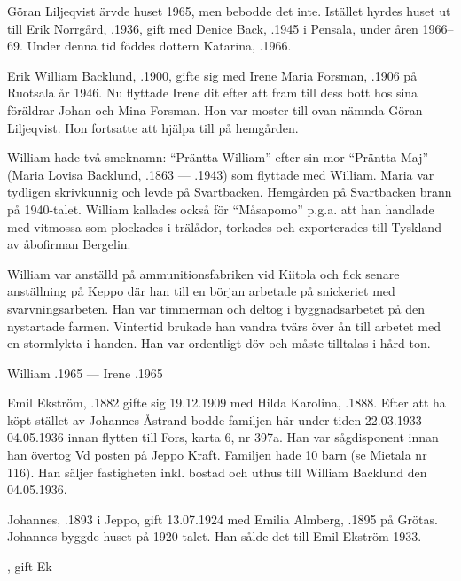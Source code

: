 %
Göran Liljeqvist ärvde huset 1965, men bebodde det inte. Istället hyrdes huset ut till Erik Norrgård, .1936, gift med Denice Back, .1945 i Pensala, under åren 1966--69. Under denna tid föddes dottern Katarina, .1966.


%
Erik William Backlund, .1900, gifte sig med Irene Maria Forsman, .1906 på Ruotsala år 1946. Nu flyttade Irene dit efter att fram till dess bott hos sina föräldrar Johan och Mina Forsman. Hon var moster till ovan nämnda Göran Liljeqvist. Hon fortsatte att hjälpa till på hemgården.

William hade två smeknamn: ``Präntta-William'' efter sin mor ``Präntta-Maj'' (Maria Lovisa Backlund, .1863 --- .1943) som flyttade med William. Maria var tydligen skrivkunnig och levde på Svartbacken. Hemgården på Svartbacken brann på 1940-talet. William kallades också för ``Måsapomo'' p.g.a. att han handlade med vitmossa som plockades i trälådor, torkades och exporterades till Tyskland av åbofirman Bergelin.

William var anställd på ammunitionsfabriken vid Kiitola och fick senare anställning på Keppo där han till en början arbetade på snickeriet med svarvningsarbeten. Han var timmerman och deltog i byggnadsarbetet på den nystartade farmen. Vintertid brukade han vandra tvärs över ån till arbetet med en stormlykta i handen. Han var ordentligt döv och måste tilltalas i hård ton.

William .1965  ---  Irene .1965


%
Emil Ekström, .1882 gifte sig 19.12.1909 med Hilda Karolina, .1888. Efter att ha köpt stället av Johannes Åstrand bodde familjen här under tiden 22.03.1933--04.05.1936 innan flytten till Fors, karta 6, nr 397a. Han var sågdisponent innan han övertog Vd posten på Jeppo Kraft. Familjen hade 10 barn (se Mietala nr 116). Han säljer fastigheten inkl. bostad och uthus till William Backlund den 04.05.1936.


%
Johannes, .1893 i Jeppo,  gift 13.07.1924 med Emilia Almberg, .1895 på Grötas. Johannes byggde huset på 1920-talet. Han sålde det till Emil Ekström 1933.
\begin{jhchildren}
  \item {}
  \item {}, gift Ek
\end{jhchildren}


